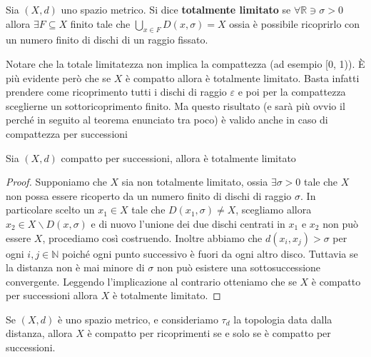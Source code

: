 \begin{definition}
    Sia \((X, d)\) uno spazio metrico. Si dice \textbf{totalmente limitato} se
    \(\forall \mathbb{R} \ni \sigma >0 \) allora \(\exists F \subseteq X \)
    finito tale che \(\bigcup_{x \in F} D(x, \sigma) = X\) ossia è possibile
    ricoprirlo con un numero finito di dischi di un raggio fissato.
\end{definition}
    Notare che la totale limitatezza non implica la compattezza (ad esempio [0, 1)). È più evidente
    però che se \(X\) è compatto allora è totalmente limitato. Basta infatti
    prendere come ricoprimento tutti i dischi di raggio \(\varepsilon\) e poi
    per la compattezza sceglierne un sottoricoprimento finito.
    Ma questo risultato (e sarà più ovvio il perché in seguito al teorema enunciato
    tra poco) è valido anche in caso di compattezza per successioni
    \begin{lemmao}\label{sequentially_compact_then_totally_bounded}
    Sia \((X, d)\) compatto per successioni, allora è totalmente limitato
\end{lemmao}
    \begin{proof}
Supponiamo che \(X\) sia non totalmente
    limitato, ossia \(\exists \sigma > 0\) tale che \(X\) non possa essere
    ricoperto da un numero finito di dischi di raggio \(\sigma\). In particolare
    scelto un \(x_{1} \in X\) tale che \(D(x_{1}, \sigma) \neq X\), scegliamo
    allora \(x_{2} \in X \smallsetminus D(x, \sigma)\) e di nuovo l'unione dei
    due dischi centrati in \(x_{1}\) e \(x_{2}\) non può essere \(X\),
    procediamo così costruendo. Inoltre abbiamo che \(d(x_{i}, x_{j}) > \sigma\)
    per ogni \(i, j \in \mathbb{N}\) poiché ogni punto successivo è fuori da
    ogni altro disco. Tuttavia se la distanza non è mai minore di \(\sigma\) non
    può esistere una sottosuccessione convergente.
    Leggendo l'implicazione al contrario otteniamo che se \(X\) è compatto per
    successioni allora \(X\) è totalmente limitato.
    \end{proof}
\begin{theorem}
    Se \((X, d)\) è uno spazio metrico, e consideriamo \(\tau_d\) la topologia
    data dalla distanza, allora \(X\) è compatto per ricoprimenti se e solo se è
    compatto per successioni.
\end{theorem}
